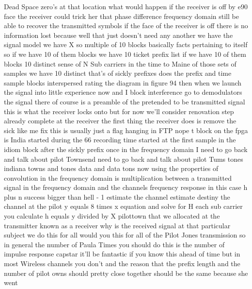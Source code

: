 \documentclass[]{book}
\begin{document}
Dead Space zero's at that location what would happen if the receiver is off by e90 face the receiver could trick her that phase difference frequency domain still be able to recover the transmitted symbols if the face of the receiver is off there is no information lost because well that just doesn't need any another we have the signal model we have X so multiple of 10 blocks basically facts pertaining to itself so if we have 10 of them blocks we have 10 ticket prefix list if we have 10 of them blocks 10 distinct sense of N Sub carriers in the time to Maine of those sets of samples we have 10 distinct that's of sickly prefixes does the prefix and time sample blocks interspersed rating the diagram in figure 94 then when we launch the signal into little experience now and I block interference go to demodulators the signal there of course is a preamble of the pretended to be transmitted signal this is what the receiver locks onto but for now we'll consider renovation step already complete at the receiver the first thing the receiver does is remove the sick like me fix this is usually just a flag hanging in FTP nope t block on the fpga is India started during the 66 recording time started at the first sample in the idiom block after the sickly prefix once in the frequency domain I need to go back and talk about pilot Townsend need to go back and talk about pilot Tums tones indiana towns and tones data and data tons now using the properties of convolution in the frequency domain is multiplication between a transmitted signal in the frequency domain and the channels frequency response in this case h plus n success bigger than hell - 1 estimate the channel estimate destiny the channel at the pilot y equals 8 times x equation and solve for H each sub carrier you calculate h equals y divided by X pilottown that we allocated at the transmitter known as a receiver why is the received signal at that particular subject we do this for all would you this for all of the Pilot Jones transmission so in general the number of Paula Times you should do this is the number of impulse response capstar it'll be fantastic if you know this ahead of time but in most Wireless channels you don't and the reason that the prefix length and the number of pilot owns should pretty close together should be the same because she went
\end{document}
